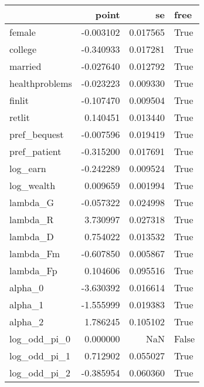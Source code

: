 \begin{tabular}{lrrl}
\toprule
{} &     point &        se &   free \\
\midrule
female         & -0.003102 &  0.017565 &   True \\
college        & -0.340933 &  0.017281 &   True \\
married        & -0.027640 &  0.012792 &   True \\
healthproblems & -0.023223 &  0.009330 &   True \\
finlit         & -0.107470 &  0.009504 &   True \\
retlit         &  0.140451 &  0.013440 &   True \\
pref\_bequest   & -0.007596 &  0.019419 &   True \\
pref\_patient   & -0.315200 &  0.017691 &   True \\
log\_earn       & -0.242289 &  0.009524 &   True \\
log\_wealth     &  0.009659 &  0.001994 &   True \\
lambda\_G       & -0.057322 &  0.024998 &   True \\
lambda\_R       &  3.730997 &  0.027318 &   True \\
lambda\_D       &  0.754022 &  0.013532 &   True \\
lambda\_Fm      & -0.607850 &  0.005867 &   True \\
lambda\_Fp      &  0.104606 &  0.095516 &   True \\
alpha\_0        & -3.630392 &  0.016614 &   True \\
alpha\_1        & -1.555999 &  0.019383 &   True \\
alpha\_2        &  1.786245 &  0.105102 &   True \\
log\_odd\_pi\_0   &  0.000000 &       NaN &  False \\
log\_odd\_pi\_1   &  0.712902 &  0.055027 &   True \\
log\_odd\_pi\_2   & -0.385954 &  0.060360 &   True \\
\bottomrule
\end{tabular}
